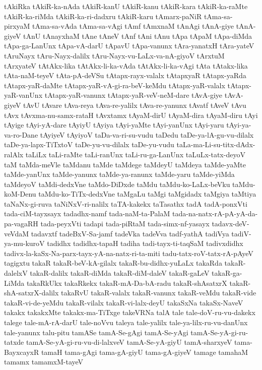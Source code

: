 {tAkiRka
tAkiR-ka-nAda
tAkiR-kanU
tAkiR-kanu
tAkiR-kara
tAkiR-ka-raMte
tAkiR-ka-riMda
tAkiR-ka-ri-dadxru
tAkiR-karu
tAmarx-paNiR
tAma-sa-pirxyaM
tAma-sa-vAda
tAma-sa-vAgi
tAmf
tAmxnaM
tAnAgi
tAnA-giye
tAnA-giyeV
tAnU
tAnayxhaM
tAne
tAneV
tAnf
tAni
tAnu
tApa
tApaM
tApa-diMda
tApa-ga-LanUnx
tApa-vA-darU
tApavU
tApa-vanunx
tAra-yanatxH
tAra-yateV
tAruNayx
tAru-Nayx-dalilx
tAru-Nayx-vu-LaLx-va-nA-giyoV
tArxtuM
tArxyateV
tAtAkx-lika
tAtAkx-li-ka-vAda
tAtAkx-li-ka-vAgi
tAta
tAtakx-lika
tAta-naM-teyeV
tAta-pA-deVSu
tAtapx-rayx-valalx
tAtapxyaR
tAtapx-yaRda
tAtapx-yaR-daMte
tAtapx-yaR-vA-gi-ra-beV-keMdu
tAtapx-yaR-valalx
tAtapx-yaR-vanUnx
tAtapx-yaR-vanunx
tAtapx-yaR-veV-neM-dare
tAvA-giye
tAvA-giyeV
tAvU
tAvare
tAva-reya
tAva-re-yalilx
tAva-re-yanunx
tAvatf
tAveV
tAvu
tAvx
tAvxma-nu-samx-rataH
tAvxtamx
tAyaM-dirU
tAyaM-dira
tAyaM-diru
tAyi
tAyige
tAyi-yA-dare
tAyiyU
tAyiya
tAyi-yaMte
tAyi-yanUnx
tAyi-yaru
tAyi-ya-va-ro-Dane
tAyiyeV
tAyiyoV
taDa-va-ri-su-vudu
taDedu
taDe-ya-lA-gu-vu-dilalx
taDe-ya-lapx-TiTxtoV
taDe-yu-vu-dilalx
taDe-yu-vudu
taLa-ma-Li-su-titx-dAdx-ralAlx
taLiLx
taLi-raMte
taLi-ranUnx
taLi-ru-ga-LanUnx
taLuLx-tatx-deyoV
taM
taMda-meVle
taMdanu
taMde
taMdege
taMdeyU
taMdeya
taMde-yaMte
taMde-yanUnx
taMde-yanunx
taMde-ya-ranunx
taMde-yaru
taMde-yiMda
taMdeyoV
taMdi-dedxVne
taMdo-DiDxde
taMdu
taMdu-ko-LaLx-beVku
taMdu-koM-Denu
taMdu-ko-TiTx-dedxVne
taMgaLu
taMgi
taMgidadx
taMgiya
taMtiya
taNaNx-gi-ruva
taNiNxV-ri-nalilx
taTA-kakekx
taTasathx
tadA
tadA-ponxVti
tada-ciM-tayxsayx
tadadhx-namf
tada-naM-ta-PalaM
tada-na-natx-rA-pA-yA-da-pa-vagaRH
tada-peyxVti
tadapi
tada-piRtaM
tada-simx-nf-yasayx
tadavx-deV-veVdaM
tadavxtf
tadeBxV-Sa-jamf
tadeVka
tadeVva
tadf-yathA
tadiVya
tadiV-ya-mu-kuroV
tadidhx
tadidhx-tapaH
tadiha
tadi-tayx-ti-taqSaM
tadivxdidhx
tadivx-la-kaSx-Na-parx-tayx-yA-na-natx-ri-ta-miti
tadu-tatx-roV-tatx-rA-pAyeV
tagigxtu
takaR
takaR-beV-kA-gilalx
takaR-bu-didhx-yuLaLx
takaRda
takaR-dalelxV
takaR-dalilx
takaR-diMda
takaR-diM-daleV
takaR-gaLeV
takaR-ga-LiMda
takaRkUkx
takaRkekx
takaR-mA-Da-bA-radu
takaR-shAsatxrX
takaR-shA-satxrX-dalilx
takaRvU
takaR-valalx
takaR-vanunx
takaR-veMdu
takaR-vide
takaR-vi-de-yeMdu
takaR-vilalx
takaR-vi-lalx-deyU
takaSxNa
takaSx-NaveV
takakx
takakxMte
takakx-ma-TiTxge
takeVRNa
talA
tale
tale-doV-ru-vu-dakekx
talege
tale-mA-rA-darU
tale-noVvu
taleya
tale-yalilx
tale-ya-lilx-ru-vu-danUnx
tale-yanunx
talu-pitu
tamASe
tamA-Se-gAgi
tamA-Se-yAgi
tamA-Se-yA-gi-ru-tatxde
tamA-Se-yA-gi-ru-vu-di-lalxveV
tamA-Se-yA-giyU
tamA-sharxyeV
tama-BayxcayxR
tamaH
tama-gAgi
tama-gA-giyU
tama-gA-giyeV
tamage
tamahaM
tamamx
tamamxM-tayeV
}
